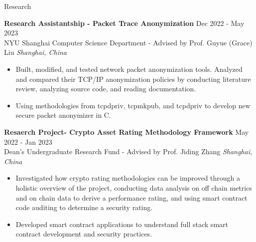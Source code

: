 \documentclass{cv} %
\begin{document}
\begin{rSection}{Research}

	\textbf{Research Assistantship - Packet Trace Anonymization} \hfill Dec 2022 - May 2023 \\
	NYU Shanghai Computer Science Department - Advised by Prof. Guyue (Grace) Liu \hfill \textit{Shanghai, China}
	\begin{itemize}
		\item Built, modified, and tested network packet anonymization tools. Analyzed and compared their TCP/IP anonymization policies by conducting literature review, analyzing source code, and reading documentation.
		\item Using methodologies from tcpdpriv, tcpmkpub, and tcpdpriv to develop new secure packet anonymizer in C.
	\end{itemize}

	\textbf{Resaerch Project- Crypto Asset Rating Methodology Framework} \hfill May 2022 - Jan 2023 \\
	Dean’s Undergraduate Research Fund - Advised by Prof. Jiding Zhang \hfill \textit{Shanghai, China}
	\begin{itemize}
		\item Investigated how crypto rating methodologies can be improved through a holistic overview of the project, conducting data analysis on off chain metrics and on chain data to derive a performance rating, and using smart contract code auditing to determine a security rating.
		\item Developed smart contract applications to understand full stack smart contract development and security practices.
	\end{itemize}

\end{rSection}
\end{document}
